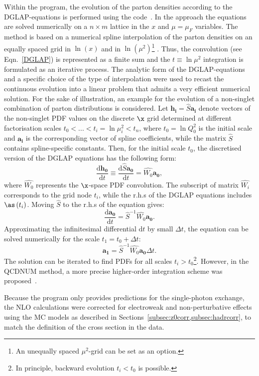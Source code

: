 Within the \herafitter program, the evolution of the parton densities according to the DGLAP-equations is performed using the \qcdnum code~\cite{Botje:2010ay}. In the \qcdnum approach the equations are solved numerically on a $n\times m$ lattice in the $x$ and $\mu=\mu_F$ variables. The method is based on a numerical spline interpolation of the parton densities on an equally spaced grid in $\ln\left(x\right)$ and in $\ln\left(\mu^2\right)$\footnote{An unequally spaced $\mu^2$-grid can be set as an option.} . Thus, the convolution (see Eqn.~\ref{DGLAP}) is represented as a finite sum and the $t \equiv \ln{\mu^2}$ integration is formulated as an iterative process.
The analytic form of the DGLAP-equations and a specific choice of the type of interpolation were used to recast the continuous evolution into a linear problem that admits a very efficient numerical solution. For the sake of illustration, an example for the evolution of a non-singlet combination of parton distributions is considered. Let $\mathbf{h_i}=\hat{S}\mathbf{a_i}$ denote vectors of the non-singlet PDF values on the discrete $\x$ grid determined at different factorisation scales $t_0 < ... < t_i=\ln{\mu^2_i} < t_n$, where $t_0=\ln{Q^2_0}$ is the initial scale and $\mathbf{a_i}$ is the corresponding vector of spline coefficients, while the matrix $\hat{S}$ contains spline-specific constants. Then, for the initial scale $t_0$, the discretised version of the DGLAP equations has the following form:
\begin{equation}
 \frac{\mathrm{d}\mathbf{h_0}}{\mathrm{d}t} \equiv \frac{\mathrm{d}\hat{S}\mathbf{a_0}}{\mathrm{d}t} = \hat{W_0}\mathbf{a_0},
\end{equation}
where $\hat{W_0}$ represents the $\x$-space PDF convolution. The subscript of matrix $\hat{W_i}$ corresponds to the grid node $t_i$, while the r.h.s of the DGLAP equations includes $\as\left(t_i\right)$. Moving $\hat{S}$ to the r.h.s of the equation gives:
\begin{equation}
 \frac{\mathrm{d}\mathbf{a_0}}{\mathrm{d}t} = \hat{S}^{-1}\hat{W_0}\mathbf{a_0}.
\end{equation}
Approximating the infinitesimal differential $\mathrm{d}t$ by small $\Delta t$, the equation can be solved numerically for the scale $t_1=t_0+\Delta t$:
\begin{equation}
 \mathbf{a_1} = \hat{S}^{-1}\hat{W_0}\mathbf{a_0}\Delta t.
\end{equation}
The solution can be iterated to find PDFs for all scales $t_i>t_0$\footnote{In principle, backward evolution $t_i<t_0$ is possible.}. However, in the QCDNUM method, a more precise higher-order integration scheme was proposed~\cite{Botje:2010ay}.

Because the \nlojet program only provides predictions for the single-photon exchange, the NLO calculations were corrected for electroweak and non-perturbative effects using the MC models as described in Sections~\ref{subsec:z0corr,subsec:hadrcorr}, to match the definition of the cross section in the data.
